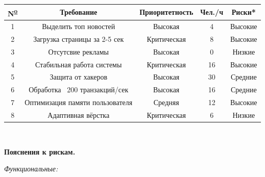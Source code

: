 \begin{center}
    \small
    \begin{tabular}{|c|c|c|c|c|}
        \hline
        N\textsuperscript{\underline{o}} & Требование                      & Приоритетность & Чел./ч & Риски*  \\
        \hline
        1                                & Выделить топ новостей           & Высокая        & 4      & Высокие \\
        \hline
        2                                & Загрузка страницы за 2-5 сек    & Критическая    & 8      & Высокие \\
        \hline
        3                                & Отсутсвие рекламы               & Высокая        & 0      & Низкие  \\
        \hline
        4                                & Стабильная работа системы       & Критическая    & 16     & Высокие \\
        \hline
        5                                & Защита от хакеров               & Высокая        & 30     & Средние \\
        \hline
        6                                & Обработка ~200 транзакций/сек   & Высокая        & 16     & Средние \\
        \hline
        7                                & Оптимизация памяти пользователя & Средняя        & 12     & Высокие \\
        \hline
        8                                & Адаптивная вёрстка              & Критическая    & 6      & Низкие  \\
        \hline
    \end{tabular}\\

\end{center}
\vspace{0.5cm}
\begin{center}
    \large
    \textbf{Пояснения к рискам.}\\
\end{center}
\normalsize
\textit{Функциональные:}
